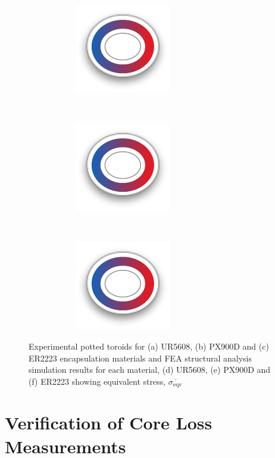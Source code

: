 \documentclass[conference]{IEEEtran}
\begin{document}
\begin{figure}
\begin{subfigure}{\textwidth}
    \begin{subfigure}{0.3\textwidth}
      \centering
      \includegraphics{figures/featoroid.pdf}
      \caption{}
    \end{subfigure}~
    \begin{subfigure}{0.3\textwidth}
      \centering
      \includegraphics{figures/featoroid.pdf}
      \caption{}
    \end{subfigure}~
    \begin{subfigure}{0.3\textwidth}
      \centering
      \includegraphics{figures/featoroid.pdf}
      \caption{}
    \end{subfigure}
  \end{subfigure}
  \caption{Experimental potted toroids for (a) UR5608, (b) PX900D and (c) ER2223 encapsulation materials and FEA structural analysis simulation results for each material, (d) UR5608, (e) PX900D and (f) ER2223 showing equivalent stress, $\overline{\sigma_\text{eqv}}$}
  \label{fig:pottedtoroids}
\end{figure}


\section{Verification of Core Loss Measurements}
\label{sec:simulation}
\end{document}
